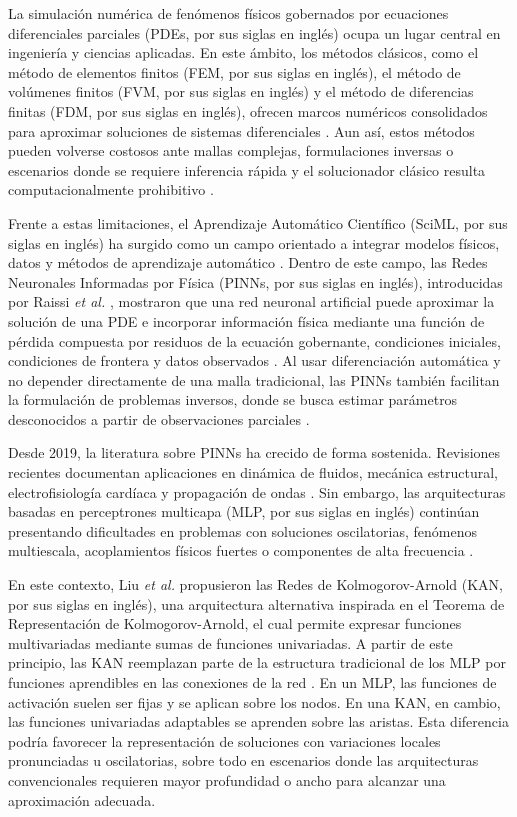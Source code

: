 \label{sec:introduccion}

La simulación numérica de fenómenos físicos gobernados por ecuaciones diferenciales parciales (PDEs, por sus siglas en inglés) ocupa un lugar central en ingeniería y ciencias aplicadas. En este ámbito, los métodos clásicos, como el método de elementos finitos (FEM, por sus siglas en inglés), el método de volúmenes finitos (FVM, por sus siglas en inglés) y el método de diferencias finitas (FDM, por sus siglas en inglés), ofrecen marcos numéricos consolidados para aproximar soluciones de sistemas diferenciales \cite{grossmann2024}. Aun así, estos métodos pueden volverse costosos ante mallas complejas, formulaciones inversas o escenarios donde se requiere inferencia rápida y el solucionador clásico resulta computacionalmente prohibitivo \cite{karniadakis2021}.

Frente a estas limitaciones, el Aprendizaje Automático Científico (SciML, por sus siglas en inglés) ha surgido como un campo orientado a integrar modelos físicos, datos y métodos de aprendizaje automático \cite{karniadakis2021}. Dentro de este campo, las Redes Neuronales Informadas por Física (PINNs, por sus siglas en inglés), introducidas por Raissi \textit{et al.} \cite{raissi2019}, mostraron que una red neuronal artificial puede aproximar la solución de una PDE e incorporar información física mediante una función de pérdida compuesta por residuos de la ecuación gobernante, condiciones iniciales, condiciones de frontera y datos observados \cite{lagaris1998}. Al usar diferenciación automática y no depender directamente de una malla tradicional, las PINNs también facilitan la formulación de problemas inversos, donde se busca estimar parámetros desconocidos a partir de observaciones parciales \cite{raissi2019}.

Desde 2019, la literatura sobre PINNs ha crecido de forma sostenida. Revisiones recientes documentan aplicaciones en dinámica de fluidos, mecánica estructural, electrofisiología cardíaca y propagación de ondas \cite{karniadakis2021,toscano2025pikans}. Sin embargo, las arquitecturas basadas en perceptrones multicapa (MLP, por sus siglas en inglés) continúan presentando dificultades en problemas con soluciones oscilatorias, fenómenos multiescala, acoplamientos físicos fuertes o componentes de alta frecuencia \cite{karniadakis2021,rahaman2019}.

En este contexto, Liu \textit{et al.} propusieron las Redes de Kolmogorov-Arnold (KAN, por sus siglas en inglés), una arquitectura alternativa inspirada en el Teorema de Representación de Kolmogorov-Arnold, el cual permite expresar funciones multivariadas mediante sumas de funciones univariadas. A partir de este principio, las KAN reemplazan parte de la estructura tradicional de los MLP por funciones aprendibles en las conexiones de la red \cite{liu2024kan}. En un MLP, las funciones de activación suelen ser fijas y se aplican sobre los nodos. En una KAN, en cambio, las funciones univariadas adaptables se aprenden sobre las aristas. Esta diferencia podría favorecer la representación de soluciones con variaciones locales pronunciadas u oscilatorias, sobre todo en escenarios donde las arquitecturas convencionales requieren mayor profundidad o ancho para alcanzar una aproximación adecuada.

